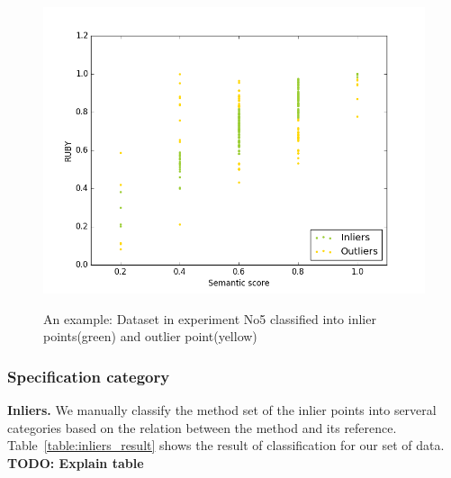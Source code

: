 \begin{figure}[t]
	\caption{An example: Dataset in experiment No5 classified into inlier points(green) and outlier point(yellow)}
	\includegraphics[scale=0.4]{img/inliers_outliers.png}
	\centering
	\label{fig:inliers_outliers}
\end{figure}

\subsubsection{Specification category}
\textbf{Inliers.} We manually classify the method set of the inlier points into serveral categories based on the relation between the method and its reference. Table~\ref{table:inliers_result} shows the result of classification for our set of data.
\textbf{TODO: Explain table}


